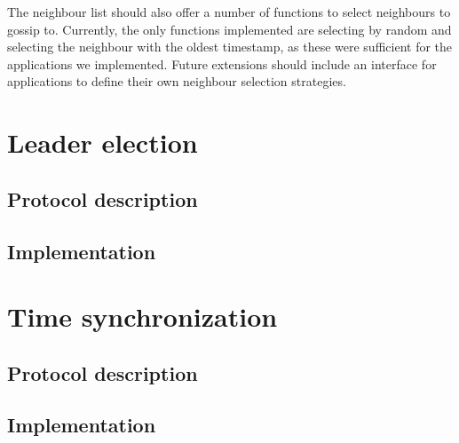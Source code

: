 \documentclass[11pt,
  a4paper,
  ngerman,
  BCOR=7mm
]{scrartcl}
\begin{document}
The neighbour list should also offer a number of functions to select
neighbours to gossip to. Currently, the only functions implemented are
selecting by random and selecting the neighbour with the oldest
timestamp, as these were sufficient for the applications we implemented.
Future extensions should include an interface for applications to define
their own neighbour selection strategies.

\section*{Leader election}
\label{sec:Leader_election}

\subsection*{Protocol description}
\label{sub:protocol_leader_election}

\subsection*{Implementation}
\label{sub:implementation_leader_election}

\section*{Time synchronization}
\label{sec:Time synchronization}

\subsection*{Protocol description}
\label{sub:protocol_time_synch}

\subsection*{Implementation}
\label{sub:implementation_time_synchronization}


\end{document}
